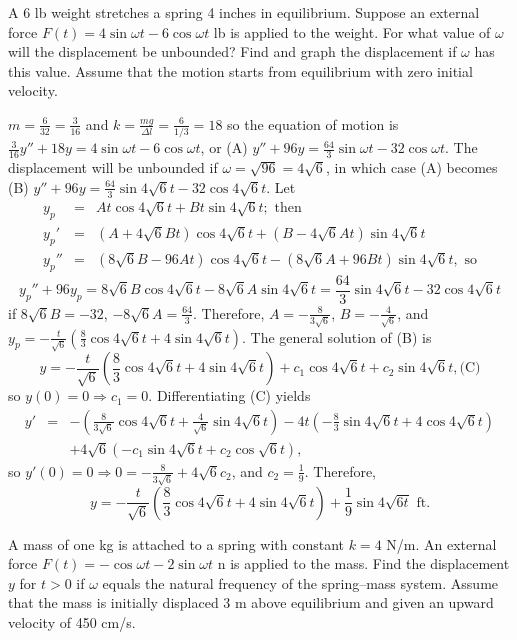 \documentclass{ximera}
\begin{document}
\begin{problem}\label{exer:6.1.16} 
A 6 lb weight stretches a spring 4 inches in equilibrium. Suppose
an external force $ F(t)=4\sin\omega t-6\cos\omega t $ lb is applied
to the weight. For what value of $\omega$ will the displacement be
unbounded? Find and graph the displacement if $\omega$ has this value.
Assume that the motion starts from equilibrium with zero initial
velocity.

\begin{solution}
$m=\frac{6}{32}=\frac{3}{16}$ and $k=\frac{mg}{\Delta
l}=\frac{6}{1/3}=18$ so the equation of motion is
$\frac{3}{16}y''+18y=4\sin\omega t-6\cos\omega t$, or (A)
$y''+96y=\frac{64}{3}\sin\omega t-32\cos\omega t$. The displacement
will be unbounded if $\omega=\sqrt{96}=4\sqrt6$, in which case (A)
becomes (B) $y''+96y=\frac{64}{3}\sin4\sqrt6t-32\cos4\sqrt6t$. Let
\begin{eqnarray*}
y_p&=&At\cos4\sqrt6t+Bt\sin4\sqrt6t; \text{ then}\\
y_p'&=&(A+4\sqrt6Bt)\cos4\sqrt6t+(B-4\sqrt6At)\sin4\sqrt6t\\
y_p''&=&(8\sqrt6B-96At)\cos4\sqrt6t-(8\sqrt6A+96Bt)\sin4\sqrt6t,
\text{ so}
\end{eqnarray*}
$$
 y_p''+96y_p=8\sqrt6B\cos4\sqrt6t-8\sqrt6A\sin4\sqrt6t=
\frac{64}{3}\sin4\sqrt6t-32\cos4\sqrt6t
$$
if $8\sqrt6B=-32$, $-8\sqrt6A=\frac{64}{3}$. Therefore,
$A=-\frac{8}{3\sqrt6}$, $B=-\frac{4}{\sqrt6}$, and
$y_p=-\frac{t}{\sqrt6}\left(\frac{8}{3}\cos4\sqrt6t+
4\sin4\sqrt6t\right)$.
The general solution of (B) is
$$
y=-\frac{t}{\sqrt6}\left(\frac{8}{3}\cos4\sqrt6t+4\sin4\sqrt6t\right)
+c_1\cos4\sqrt6t+c_2\sin4\sqrt6t,
\text{(C)}
$$
so $y(0)=0\Rightarrow c_1=0$. Differentiating
(C) yields
\begin{eqnarray*}
y'&=&-\left(\frac{8}{3\sqrt6}\cos4\sqrt6t+
\frac{4}{\sqrt6} \sin4\sqrt6t\right)
-4t\left(-\frac{8}{3} \sin4\sqrt6t+
4\cos4\sqrt6t\right)\\
&&+4\sqrt6(-c_1\sin4\sqrt6t+c_2\cos\sqrt6t),
\end{eqnarray*}
so $y'(0)=0\Rightarrow 0=-\frac{8}{3\sqrt6}+4\sqrt6c_2$, and
$c_2=\frac{1}{9}$. Therefore,
$$
y=-\frac{t}{\sqrt6} \left(\frac{8}{3}\cos4\sqrt6t+4\sin
4\sqrt6t\right)+\frac{1}{9}\sin 4\sqrt{6t}\text{ ft}.
$$
\end{solution}
\end{problem}

\begin{problem}\label{exer:6.1.17}
A mass of one kg is attached to a spring with constant $k=4$ N/m. An
external force $F(t)=-\cos\omega t-2\sin\omega t$ n is applied to the
mass. Find the displacement $y$ for $t>0$ if $\omega$ equals the
natural frequency of the spring--mass system. Assume that the
mass is initially displaced 3 m above equilibrium and given an upward
velocity of 450 cm/s.
\end{problem}
\end{document}
